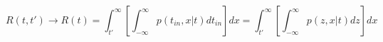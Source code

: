 \begin{equation}
R(t,t') \to R(t)= \int_{t'}^\infty \left[ \int_{-\infty}^\infty p(t_{in},x|t) dt_{in} \right]  dx = \int_{t'}^\infty \left[ \int_{-\infty}^\infty p(z,x|t) dz \right] dx
\end{equation}